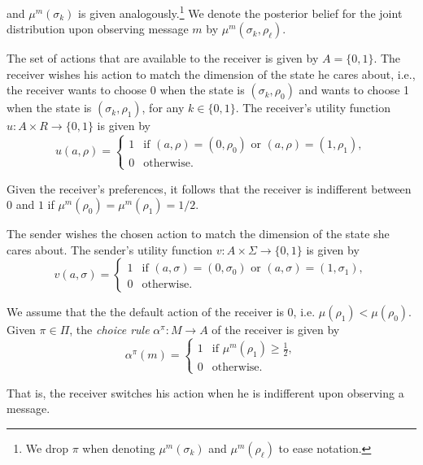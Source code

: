 \documentclass[12pt,english]{article}
\theoremstyle{plain}
\begin{document}
\noindent and $\mu^m(\sigma_k)$ is given analogously.\footnote{We drop $\pi$ when denoting $\mu^m(\sigma_k)$ and $\mu^m(\rho_\ell)$ to ease notation.} 
We denote the posterior belief for the joint distribution upon observing message $m$ by $\mu^m(\sigma_k,\rho_\ell)$. 

The set of actions that are available to the receiver is given by $A=\{0,1\}$. 
The receiver wishes his action to match the dimension of the state he cares about, i.e., the receiver wants to choose 0 when the state is $(\sigma_k,\rho_0)$ and wants to choose 1 when the state is $(\sigma_k,\rho_1)$, for any $k\in\{0,1\}$. 
The receiver's utility function $u:A\times R\rightarrow\{0,1\}$ is given by 
\[
u\left(a,\rho\right)=\begin{cases}
1 & \text{if }\left(a,\rho\right)=\left(0,\rho_0\right)\text{ or }\left(a,\rho\right)=\left(1,\rho_1\right),\\
0 & \text{otherwise.}
\end{cases} 
\]

Given the receiver's preferences, it follows that the receiver is indifferent between $0$ and $1$ if $\mu^m(\rho_0)=\mu^m(\rho_1)=1/2$. 

The sender wishes the chosen action to match the dimension of the state she cares about. 
The sender's utility function $v:A\times\Sigma\rightarrow\{0,1\}$ is given by 
\[
v\left(a,\sigma\right)=\begin{cases}
1 & \text{if }\left(a,\sigma\right)=\left(0,\sigma_0\right)\text{ or }\left(a,\sigma\right)=\left(1,\sigma_1\right),\\
0 & \text{otherwise.}
\end{cases} 
\]

We assume that the the default action of the receiver is $0$, i.e. $\mu(\rho_1)<\mu(\rho_0)$.
Given $\pi\in\Pi$, the \emph{choice rule} $\alpha^\pi:M\rightarrow A$ of the receiver is given by
\begin{equation}
\alpha^\pi\left(m\right)=\begin{cases}
1 & \text{if }\mu^m(\rho_1)\geq\frac12,\\
0 & \text{otherwise.}
\end{cases}\label{action_strategy}
\end{equation}

\noindent That is, the receiver switches his action when he is indifferent upon observing a message.
\end{document}
